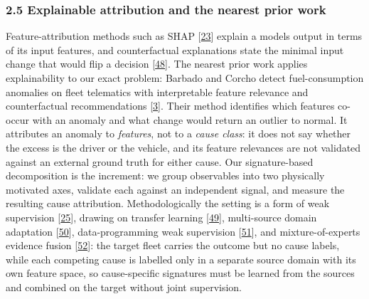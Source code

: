 \subsubsection{2.5 Explainable attribution and the nearest prior
work}\label{explainable-attribution-and-the-nearest-prior-work}

Feature-attribution methods such as SHAP {[}\hyperref[r23]{23}{]}
explain a model\textquotesingle s output in terms of its input features,
and counterfactual explanations state the minimal input change that
would flip a decision {[}\hyperref[r48]{48}{]}. The nearest prior work
applies explainability to our exact problem: Barbado and Corcho detect
fuel-consumption anomalies on fleet telematics with interpretable
feature relevance and counterfactual recommendations
{[}\hyperref[r3]{3}{]}. Their method identifies which features co-occur
with an anomaly and what change would return an outlier to normal. It
attributes an anomaly to \emph{features}, not to a \emph{cause class}:
it does not say whether the excess is the driver or the vehicle, and its
feature relevances are not validated against an external ground truth
for either cause. Our signature-based decomposition is the increment: we
group observables into two physically motivated axes, validate each
against an independent signal, and measure the resulting cause
attribution. Methodologically the setting is a form of weak supervision
{[}\hyperref[r25]{25}{]}, drawing on transfer learning
{[}\hyperref[r49]{49}{]}, multi-source domain adaptation
{[}\hyperref[r50]{50}{]}, data-programming weak supervision
{[}\hyperref[r51]{51}{]}, and mixture-of-experts evidence fusion
{[}\hyperref[r52]{52}{]}: the target fleet carries the outcome but no
cause labels, while each competing cause is labelled only in a separate
source domain with its own feature space, so cause-specific signatures
must be learned from the sources and combined on the target without
joint supervision.

